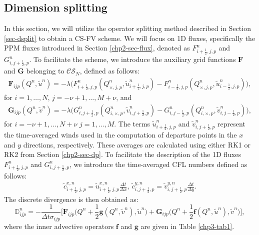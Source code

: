 \subsection{Dimension splitting}
\label{sec-csdsplit}
In this section, we will utilize the operator splitting method described in Section \ref{sec-dsplit} 
to obtain a CS-FV scheme.
We will focus on 1D fluxes, specifically the PPM fluxes introduced in Section \ref{chp2-sec-flux},
denoted as ${F}_{i+\frac{1}{2},j,p}^n$ and ${G}_{i,j+\frac{1}{2},p}^n$.
To facilitate the scheme, we introduce the auxiliary grid functions $\mathbf{F}$ and $\mathbf{G}$ belonging to $\mathcal{CS}_{N}$, defined as follows:
\begin{align*}
	\mathbf{F}_{ijp}({Q^n,\tilde{u}^n}) = -{\lambda} \bigg({F}_{i+\frac{1}{2},j,p}^n(Q^n_{\times,j,p},\tilde{u}^n_{i+\frac{1}{2},j,p})-
	{F}_{i-\frac{1}{2},j,p}^n(Q^n_{\times,j,p},\tilde{u}^n_{i-\frac{1}{2},j,p}) \bigg),
\end{align*}
for $i=1, \ldots, N$, $j=-\nu+1, \ldots, M + \nu$, and
\begin{align*}
	\mathbf{G}_{ijp}({Q^n,\tilde{v}^n}) = -{\lambda} \bigg({G}_{i,j+\frac{1}{2},p}^n(Q^n_{i,\times,p},\tilde{v}^n_{i,j+\frac{1}{2},p})-
	{G}_{i,j-\frac{1}{2},p}^n(Q^n_{i,\times,p},\tilde{v}^n_{i,j-\frac{1}{2},p}) \bigg),
\end{align*}
for $i=-\nu+1, \ldots, N + \nu$  $j=1, \ldots, M$.
The terms $\tilde{u}^n_{i+\frac{1}{2},j,p}$ and $\tilde{v}^n_{i,j+\frac{1}{2},p}$ represent the 
time-averaged winds used in the computation of departure points in the $x$ and $y$ directions, respectively. 
These averages are calculated using either RK1 or RK2 from Section \ref{chp2-sec-dp}. 
To facilitate the description of the 1D fluxes ${F}_{i+\frac{1}{2},j,p}^n$ and ${G}_{i,j+\frac{1}{2},p}^n$, 
we introduce the time-averaged CFL numbers defined as follows:
\begin{align*}
	\tilde{c}_{i+\frac{1}{2},j,p}^{x,n} = \tilde{u}_{i+\frac{1}{2},j,p}^{x,n}\frac{\Delta t}{\Delta x},\
	\tilde{c}_{i,j+\frac{1}{2},p}^{y,n} = \tilde{v}_{i,j+\frac{1}{2},p}^{y,n}\frac{\Delta t}{\Delta y}.
\end{align*}
The discrete divergence is then obtained as:
\begin{equation}
	\mathbb{D}^n_{ijp} = -\frac{1}{\Delta t \sigma_{ijp}}
	\bigg[
	\mathbf{F}_{ijp}\bigg(Q^n + \frac{1}{2}\mathbf{g}(Q^n,\tilde{v}^n), \tilde{u}^n \bigg) 
	+\mathbf{G}_{ijp}\bigg(Q^n + \frac{1}{2}\mathbf{f}(Q^n,\tilde{u}^n), \tilde{v}^n \bigg) \bigg],
\end{equation}
where the inner advective operators $\mathbf{f}$ and $\mathbf{g}$ are given in Table \ref{chp3-tab1}.

